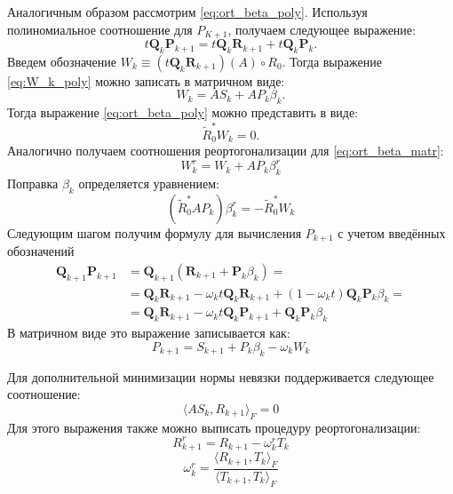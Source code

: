 Аналогичным образом рассмотрим \eqref{eq:ort_beta_poly}. Используя полиномиальное соотношение для 
$P_{K+1}$, получаем следующее выражение:
\begin{equation}
    \label{eq:W_k_poly}
    t\mathbf{Q}_k\mathbf{P}_{k+1} = t\mathbf{Q}_k\mathbf{R}_{k+1} + t\mathbf{Q}_k\mathbf{P}_k.
\end{equation}
Введем обозначение $W_k \equiv (t \mathbf{Q}_k \mathbf{R}_{k+1} )(A) \circ R_0$. 
Тогда выражение \eqref{eq:W_k_poly} можно записать в матричном виде:
\begin{equation}
    \label{eq:W_k_matr}
    W_k = AS_k + AP_k\beta_k.
\end{equation}
Тогда выражение \eqref{eq:ort_beta_poly} можно представить в виде: 
\begin{equation}
    \label{eq:ort_beta_matr}
    \tilde{R}_0^*W_k = 0.
\end{equation}
Аналогично получаем соотношения реортогонализации для \eqref{eq:ort_beta_matr}:
\begin{equation*}
    W_k^r = W_k + AP_k\beta_k^r
\end{equation*}
Поправка $\beta_k$ определяется уравнением:
\begin{equation*}
    (\tilde{R}_0^*AP_k)\beta_k^r = -\tilde{R}_0^*W_k
\end{equation*}
Следующим шагом получим формулу для вычисления $P_{k+1}$ с учетом введённых обозначений
\begin{align*}
    \mathbf{Q}_{k+1}\mathbf{P}_{k+1} &= \mathbf{Q}_{k+1}(\mathbf{R}_{k+1} + \mathbf{P}_{k}\beta_k) = \\
                                     &= \mathbf{Q}_{k}\mathbf{R}_{k+1} - \omega_kt\mathbf{Q}_{k}\mathbf{R}_{k+1} + (1-\omega_kt)\mathbf{Q}_{k}\mathbf{P}_{k}\beta_k = \\
                                     &= \mathbf{Q}_{k} \mathbf{R}_{k+1} - \omega_kt\mathbf{Q}_{k}\mathbf{P}_{k+1} + \mathbf{Q}_{k} \mathbf{P}_{k} \beta_k
\end{align*}
В матричном виде это выражение записывается как:
\begin{equation*}
    P_{k+1} = S_{k+1} + P_k \beta_k - \omega_k W_k
\end{equation*}

Для дополнительной минимизации нормы невязки поддерживается следующее соотношение:
$$ \langle AS_k,R_{k+1}\rangle_F=0 $$
Для этого выражения также можно выписать процедуру реортогонализации:
\begin{equation*}
    R_{k+1}^r = R_{k+1} - \omega_k^r T_k
\end{equation*}
\begin{equation*}
    \omega_k^r = \frac{\langle R_{k+1}, T_k \rangle_F}{\langle T_{k+1}, T_k \rangle_F}
\end{equation*}

